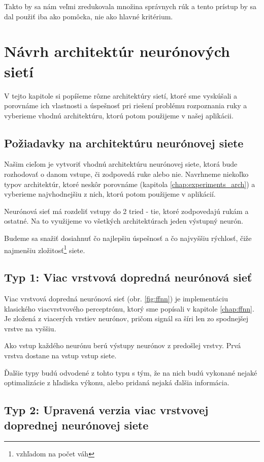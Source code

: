 Takto by sa nám veľmi zredukovala množina správnych rúk a tento prístup by sa dal použiť iba ako pomôcka, nie ako hlavné kritérium.

\section{Návrh architektúr neurónových sietí}\label{chap:neuralnetarch}

V tejto kapitole si popíšeme rôzne architektúry sietí, ktoré sme vyskúšali a porovnáme ich vlastnosti a úspešnosť pri riešení problému rozpoznania ruky a vyberieme vhodnú architektúru, ktorú potom použijeme v našej aplikácii.

\subsection{Požiadavky na architektúru neurónovej siete}

Našim cieľom je vytvoriť vhodnú architektúru neurónovej siete, ktorá bude rozhodovať o danom vstupe, či zodpovedá ruke alebo nie. 
Navrhneme niekoľko typov architektúr, ktoré neskôr porovnáme (kapitola \ref{chap:experiments_arch}) a vyberieme najvhodnejšiu z nich, ktorú potom použijeme v aplikácií. 

Neurónová sieť má rozdeliť vstupy do 2 tried - tie, ktoré zodpovedajú rukám a ostatné. Na to využijeme vo všetkých architektúrach jeden výstupný neurón.

Budeme sa snažiť dosiahnuť čo najlepšiu úspešnosť a čo najvyššiu rýchlosť, čiže najmenšiu zložitosť\footnote{vzhľadom na počet váh} siete.

\subsection{Typ 1: Viac vrstvová dopredná neurónová sieť}

Viac vrstvová dopredná neurónová sieť (obr. \ref{fig:ffnn}) je implementáciu klasického viacvrstvového perceptrónu, ktorý sme popísali v kapitole \ref{chap:ffnn}. Je zložená z viacerých vrstiev neurónov, pričom signál sa šíri len zo spodnejšej vrstve na vyššiu.

Ako vstup každého neurónu berú výstupy neurónov z predošlej vrstvy. Prvá vrstva dostane na vstup vstup siete. 

Ďalšie typy budú odvodené z tohto typu s tým, že na nich budú vykonané nejaké optimalizácie z hľadiska výkonu, alebo pridaná nejaká ďalšia informácia.

\subsection{Typ 2: Upravená verzia viac vrstvovej doprednej neurónovej siete}

